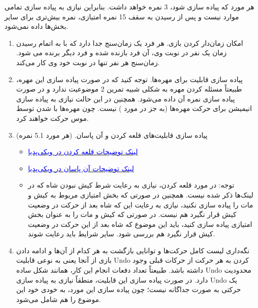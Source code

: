 \documentclass[]{article}
\begin{document}
\begin{itemize}[label = {$\blacksquare$}]
هر مورد که پیاده سازی شود، 3 نمره خواهد داشت. بنابراین نیازی به پیاده سازی تمامی موارد نیست و پس از رسیدن به سقف 15 نمره امتیازی، نمره بیش‌تری برای سایر بخش‌ها داده نمی‌شود.

\begin{enumerate}


\item
امکان زمان‌دار کردن بازی. هر فرد یک زمان‌سنج جدا دارد که با به اتمام رسیدن زمان یک نفر در نوبت وی، آن فرد بازنده شده و فرد دیگر برنده می شود. زمان‌سنج هر نفر تنها در نوبت خود وی کار می‌کند.


\item
 پیاده سازی قابلیت برای مهره‌ها. توجه کنید که در صورت پیاده سازی این مهره، طبیعتاً مسئله  کردن مهره به شکلی شبیه تمرین 2 موضوعیت ندارد و در صورت پیاده سازی  نمره آن داده می‌شود. همچنین در این حالت نیازی به پیاده سازی انیمیشن برای حرکت مهره‌ها (به جز در مورد ) نیست. 
 چون مهره‌ها با  شدن توسط موس حرکت خواهند کرد.

\newpage
\item
پیاده سازی قابلیت‌های قلعه کردن و آن پاسان. (هر مورد 5.1 نمره)


\begin{itemize}[label = $\Leftarrow$]

\item
\href{https://en.wikipedia.org/wiki/Castling}{\textcolor{blue}{لینک توضیحات قلعه کردن در ویکی‌پدیا}}

\item
\href{https://en.wikipedia.org/wiki/En_passant}{\textcolor{blue}{لینک توضیحات آن پاسان در ویکی‌پدیا}}


\end{itemize}


\begin{itemize}[label = $\blacksquare$]

\item
توجه:
در مورد قلعه کردن،‌ نیازی به رعایت شرط کیش نبودن شاه که در لینک‌ها ذکر شده نیست. همچنین در صورتی که بخش امتیازی مربوط به کیش و مات را پیاده سازی نکنید، نیازی به رعایت این که شاه بعد از حرکت در وضعیت کیش قرار نگیرد هم نیست. در صورتی که کیش و مات را به عنوان بخش امتیازی پیاده سازی کنید، باید این موضوع که شاه بعد از این حرکت در وضعیت کیش قرار نگیرد هم بررسی شود. سایر شرایط باید رعایت شوند.


\end{itemize}

\item
نگه‌داری لیست کامل حرکت‌ها و توانایی بازگشت به هر کدام از آن‌ها و ادامه دادن بازی از آنجا یعنی به نوعی قابلیت Undo کردن به هر حرکت از حرکات قبلی وجود داشته باشد. طبیعتاً تعداد دفعات انجام این کار، همانند شکل ساده Undo محدودیت دارد. در صورت پیاده سازی این قابلیت، منطقاً نیازی به پیاده سازی Undo یک حرکتی به صورت جداگانه نیست؛ چون پیاده سازی این مورد، به خودی خود این موضوع را هم شامل می‌شود.


\end{enumerate}
\end{itemize}
\end{document}
